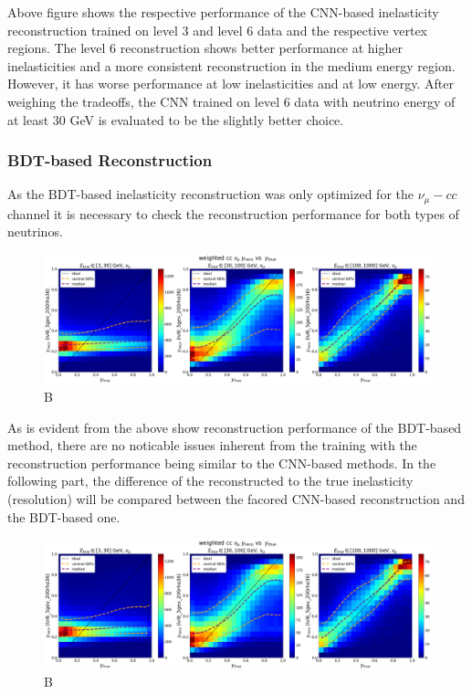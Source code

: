 \documentclass[a4paper,12pt,numbered]{article}
\begin{document}
Above figure shows the respective performance of the CNN-based inelasticity reconstruction trained on level 3 and level 6 data and the respective vertex regions. The level 6 reconstruction shows better performance at higher inelasticities and a more consistent reconstruction in the medium energy region. However, it has worse performance at low inelasticities and at low energy. After weighing the tradeoffs, the CNN trained on level 6 data with neutrino energy of at least 30 GeV is evaluated to be the slightly better choice.

\subsubsection{BDT-based Reconstruction}

As the BDT-based inelasticity reconstruction was only optimized for the $\nu_\mu-cc$ channel it is necessary to check the reconstruction performance for both types of neutrinos.

\begin{figure}[H]
\centering
\includegraphics[width=\textwidth]{Graphics/Inelasticity/WithCentral68/weighted/weighted_cc_ytruevsyreco_lvl6_5gev_200rho36_numu.png}
\caption{B}
\end{figure}

As is evident from the above show reconstruction performance of the BDT-based method, there are no noticable issues inherent from the training with the reconstruction performance being similar to the CNN-based methods. In the following part, the difference of the reconstructed to the true inelasticity (resolution) will be compared between the facored CNN-based reconstruction and the BDT-based one.

\begin{figure}[H]
\centering
\includegraphics[width=\textwidth]{Graphics/Inelasticity/WithCentral68/weighted/weighted_cc_ytruevsyreco_lvl6_5gev_200rho36_numu.png}
\caption{B}
\end{figure}
\end{document}
